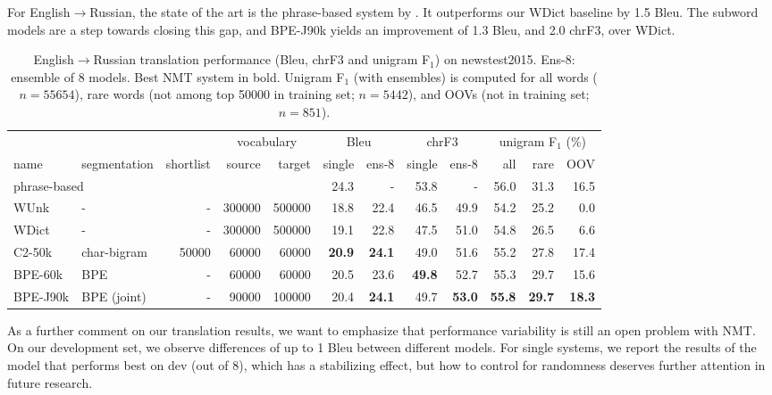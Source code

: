 \documentclass[11pt]{article}
\begin{document}
For English$\to$Russian, the state of the art is the phrase-based system by .
It outperforms our WDict baseline by 1.5 {\sc Bleu}.
The subword models are a step towards closing this gap, and BPE-J90k yields an improvement of 1.3 {\sc Bleu}, and 2.0 {\sc chrF3}, over WDict.

\begin{table*}
\centering
\small
\setlength{\tabcolsep}{3pt}
\begin{tabular}{llrrr|rr|rr|rrr}
&&&\multicolumn{2}{c|}{vocabulary}&\multicolumn{2}{c|}{{\sc Bleu}} & \multicolumn{2}{c|}{{\sc chrF3}} & \multicolumn{3}{c}{unigram F$_1$ (\%)}\\
name & segmentation & shortlist & source & target & single & ens-8 & single & ens-8 & all & rare & OOV\\
\hline
\multicolumn{3}{l}{phrase-based \cite{haddow-EtAl:2015:WMT}} & & & 
24.3 & - & 
53.8 & - & 56.0 & 31.3 & 16.5\\ %
\hline
WUnk & - & - & \num{300000} & \num{500000} & 
18.8 & 22.4 & 
46.5 & 49.9 & 54.2 & 25.2 & 0.0\\ %
WDict & - & - & \num{300000} & \num{500000} & 
19.1 & 22.8 & 
47.5 & 51.0 & 54.8 & 26.5 & 6.6\\ %
C2-50k & char-bigram & \num{50000} & \num{60000} & \num{60000} & 
\textbf{20.9} & \textbf{24.1} &
49.0 & 51.6 & 55.2 & 27.8 & 17.4\\ %
BPE-60k & BPE & - & \num{60000} & \num{60000} &
20.5 & 23.6 &
\textbf{49.8} & 52.7 & 55.3 & 29.7 & 15.6 \\ %
BPE-J90k & BPE (joint)& - & \num{90000} & \num{100000} &
20.4 & \textbf{24.1} &
49.7 & \textbf{53.0} & \textbf{55.8} & \textbf{29.7} & \textbf{18.3}\\ %
\end{tabular}
\caption{English$\to$Russian translation performance ({\sc Bleu}, {\sc chrF3} and unigram F$_1$) on newstest2015.
Ens-8: ensemble of 8 models.
Best NMT system in bold.
Unigram F$_1$ (with ensembles) is computed for all words ($n=55654$), rare words (not among top \num{50000} in training set; $n=5442$), and OOVs (not in training set; $n=851$).}
\label{results-russian}
\end{table*}

As a further comment on our translation results, we want to emphasize that performance variability is still an open problem with NMT.
On our development set, we observe differences of up to 1 {\sc Bleu} between different models.
For single systems, we report the results of the model that performs best on dev (out of 8), which has a stabilizing effect, but how to control for randomness deserves further attention in future research.
\end{document}
